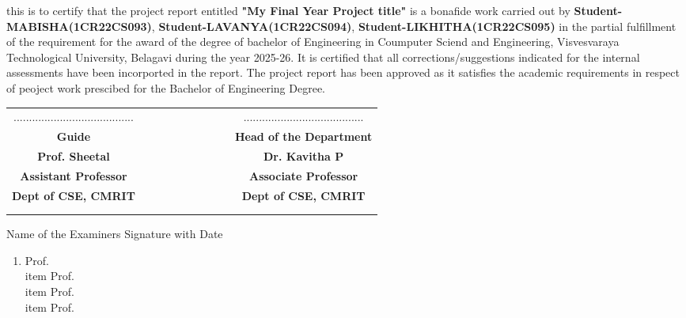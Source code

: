 \documentclass{article}
\begin{document}
\begin{titlingpage}
\begin{normalsize}
this is to certify that the project report entitled \textbf{"My Final Year Project title"} is a bonafide work carried out by \textbf{Student-MABISHA(1CR22CS093)}, \textbf{Student-LAVANYA(1CR22CS094)}, \textbf{Student-LIKHITHA(1CR22CS095)} in the partial fulfillment of the requirement for the award of the degree of bachelor of Engineering in Coumputer Sciend and Engineering, Visvesvaraya Technological University, Belagavi during the year 2025-26. It is certified that all corrections/suggestions indicated for the internal assessments have been incorported in the report. The project report has been approved as it satisfies the academic requirements in respect of peoject work prescibed for the Bachelor of Engineering Degree.
\end{normalsize}
\vfill
\vfill
\vfill
\begin{table}[h!]
\centering
\begin{tabular}{cccccccccc}
.......................................&&&&&&&&&.......................................\\
\textbf{{\footnotesize Guide}} &&&&&&&&&\textbf{{\footnotesize Head of the Department}}\\
\textbf{Prof. Sheetal}&&&&&&&&& \textbf{Dr. Kavitha P} \\
\textbf{{\footnotesize Assistant Professor}} &&&&&&&&& \textbf{{\footnotesize Associate Professor}}\\
\textbf{{\footnotesize Dept of CSE, CMRIT}} &&&&&&&&& \textbf{{\footnotesize Dept of CSE, CMRIT}}\\
\\
\\

\end{tabular}

\end{table}
Name of the Examiners    \hfill      Signature with Date
\begin{small}
\begin{enumerate}\item Prof.
\\item Prof.
\\item Prof.
\\item Prof.
\end{enumerate}
\end{small}


\end{titlingpage}
\end{document}
